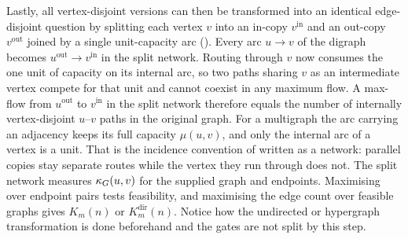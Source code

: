 Lastly, all vertex-disjoint versions can then be transformed into an identical edge-disjoint question by splitting
each vertex $v$ into an in-copy $v^{\mathrm{in}}$ and an out-copy $v^{\mathrm{out}}$ joined by a single unit-capacity arc ().
Every arc $u \to v$ of the digraph becomes $u^{\mathrm{out}} \to v^{\mathrm{in}}$ in the split network.
Routing through $v$ now consumes the one unit of capacity on its internal arc,
so two paths sharing $v$ as an intermediate vertex compete for that unit and cannot coexist in any maximum flow.
A max-flow from $u^{\mathrm{out}}$ to $v^{\mathrm{in}}$ in the split network therefore equals the number of internally vertex-disjoint $u$--$v$ paths in the original graph.
For a multigraph the arc carrying an adjacency keeps its full capacity
$\mu(u,v)$, and only the internal arc of a vertex is a unit. That is the
incidence convention of  written as a network:
parallel copies stay separate routes while the vertex they run through does not.
The split network measures $\kappa_G(u,v)$ for the supplied graph and endpoints.
Maximising over endpoint pairs tests feasibility, and maximising the edge count
over feasible graphs gives $K_m(n)$ or $K_m^{\mathrm{dir}}(n)$.
Notice how the undirected or hypergraph transformation is done beforehand and
the gates are not split by this step.

